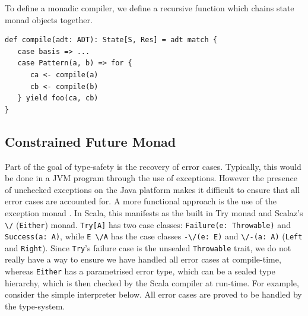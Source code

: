 \documentclass[12pt,a4paper,twoside,openright]{report}
\newcommand\codeName[1]{\texttt{#1}}
\newcommand\either[0]{\textbackslash/}
\newcommand\eitherR[0]{\textbackslash/-}
\newcommand\eitherL[0]{-\textbackslash/}
\renewcommand{\baselinestretch}{1.1}    %
\begin{document}
To define a monadic compiler, we define a recursive function which chains state monad objects together.

\renewcommand{\baselinestretch}{0.8}
\begin{framed}
\begin{verbatim}
def compile(adt: ADT): State[S, Res] = adt match {
   case basis => ...
   case Pattern(a, b) => for {
      ca <- compile(a)
      cb <- compile(b)
   } yield foo(ca, cb) 
}
\end{verbatim}
\end{framed}


	\subsection{Constrained Future Monad}
	Part of the goal of type-safety is the recovery of error cases. Typically, this would be done in a JVM program through the use of exceptions. However the presence of unchecked exceptions on the Java platform makes it difficult to ensure that all error cases are accounted for. A more functional approach is the use of the exception monad \cite{ExceptionMonad}. In Scala, this manifests as the built in Try monad and Scalaz's \codeName{\either} (\codeName{Either}) monad. \codeName{Try[A]} has two case classes: \codeName{Failure(e: Throwable)} and \codeName{Success(a: A)}, while \codeName{E \either A} has the case classes \codeName{\eitherL(e: E)} and \codeName{\eitherR(a: A)} (\codeName{Left} and \codeName{Right}). Since \codeName{Try}'s failure case is the unsealed \codeName{Throwable} trait, we do not really have a way to ensure we have handled all error cases at compile-time, whereas \codeName{Either} has a parametrised error type, which can be a sealed type hierarchy, which is then checked by the Scala compiler at run-time. For example, consider the simple interpreter below. All error cases are proved to be handled by the type-system.
\end{document}
